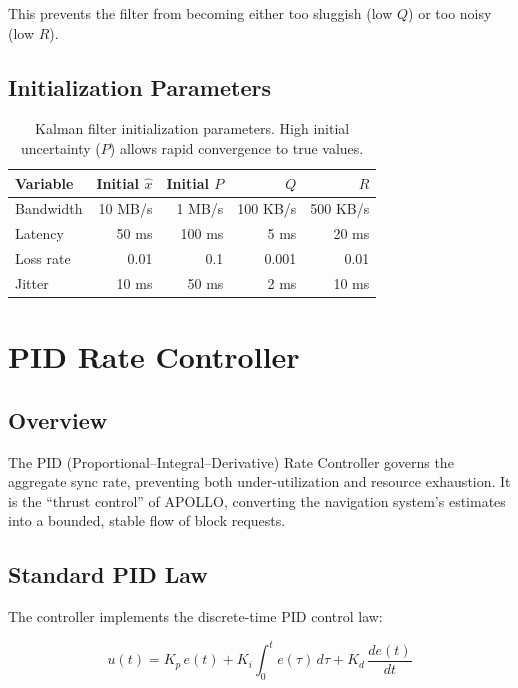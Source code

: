 \documentclass[11pt,a4paper]{article}
\begin{document}
This prevents the filter from becoming either too sluggish (low $Q$) or too noisy (low $R$).

\subsection{Initialization Parameters}

\begin{table}[h]
\centering
\begin{tabular}{lrrrr}
\toprule
\textbf{Variable} & \textbf{Initial $\hat{x}$} & \textbf{Initial $P$} & \textbf{$Q$} & \textbf{$R$} \\
\midrule
Bandwidth & 10 MB/s & 1 MB/s & 100 KB/s & 500 KB/s \\
Latency & 50 ms & 100 ms & 5 ms & 20 ms \\
Loss rate & 0.01 & 0.1 & 0.001 & 0.01 \\
Jitter & 10 ms & 50 ms & 2 ms & 10 ms \\
\bottomrule
\end{tabular}
\caption{Kalman filter initialization parameters. High initial uncertainty ($P$) allows rapid convergence to true values.}
\label{tab:kalman_init}
\end{table}

\section{PID Rate Controller}
\label{sec:pid}

\subsection{Overview}

The PID (Proportional--Integral--Derivative) Rate Controller governs the aggregate sync rate, preventing both under-utilization and resource exhaustion. It is the ``thrust control'' of APOLLO, converting the navigation system's estimates into a bounded, stable flow of block requests.

\subsection{Standard PID Law}

The controller implements the discrete-time PID control law:

\begin{equation}
u(t) = K_p \, e(t) + K_i \int_0^t e(\tau) \, d\tau + K_d \, \frac{de(t)}{dt}
\label{eq:pid}
\end{equation}
\end{document}
